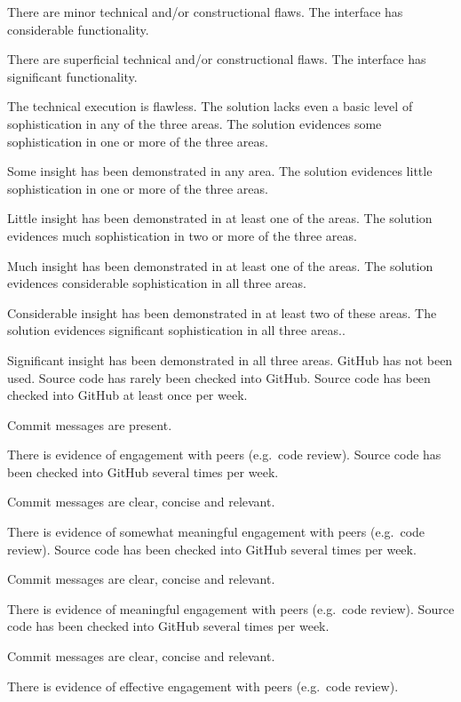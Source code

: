 \documentclass{../../fal_assignment}
\begin{document}
\begin{markingrubric}
            \par There are minor technical and/or constructional flaws.
        \grade The interface has considerable functionality.
            \par There are superficial technical and/or constructional flaws.
        \grade The interface has significant functionality.
            \par The technical execution is flawless.
%
        \grade\fail The solution lacks even a basic level of sophistication in any of the three areas.
        \grade The solution evidences some sophistication in one or more of the three areas.
            \par Some insight has been demonstrated in any area.
        \grade The solution evidences little sophistication in one or more of the three areas.
            \par Little insight has been demonstrated in at least one of the areas.
        \grade The solution evidences much sophistication in two or more of the three areas.
            \par Much insight has been demonstrated in at least one of the areas.
        \grade The solution evidences considerable sophistication in all three areas.
            \par Considerable insight has been demonstrated in at least two of these areas.
        \grade The solution evidences significant sophistication in all three areas..
            \par Significant insight has been demonstrated in all three areas.
%            
        \grade\fail GitHub has not been used.
        \grade Source code has rarely been checked into GitHub.
        \grade Source code  has been checked into GitHub at least once per week.
            \par Commit messages are present.
            \par There is evidence of engagement with peers (e.g.\ code review).
        \grade Source code  has been checked into GitHub several times per week.
            \par Commit messages are clear, concise and relevant.
            \par There is evidence of somewhat meaningful engagement with peers (e.g.\ code review).
        \grade Source code has been checked into GitHub several times per week.
            \par Commit messages are clear, concise and relevant.
            \par There is evidence of meaningful engagement with peers (e.g.\ code review).
        \grade Source code has been checked into GitHub several times per week.
            \par Commit messages are clear, concise and relevant.
            \par There is evidence of effective engagement with peers (e.g.\ code review).
%
\end{markingrubric}
\end{document}
